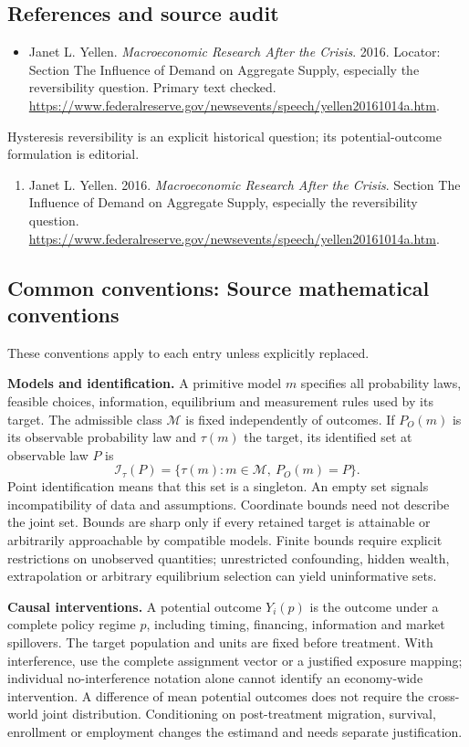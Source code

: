 \documentclass[11pt,a4paper]{article}
\begin{document}
\subsection*{References and source audit}
\begin{itemize}
\item Janet L. Yellen. \emph{Macroeconomic Research After the Crisis}. 2016. Locator: Section The Influence of Demand on Aggregate Supply, especially the reversibility question. Primary text checked. \url{https://www.federalreserve.gov/newsevents/speech/yellen20161014a.htm}.
\end{itemize}
Hysteresis reversibility is an explicit historical question; its potential-outcome formulation is editorial.
\begin{enumerate}\raggedright
\item\hypertarget{definitions:source:30007517:1}{} Janet L. Yellen. 2016. \emph{Macroeconomic Research After the Crisis}. Section The Influence of Demand on Aggregate Supply, especially the reversibility question.
\url{https://www.federalreserve.gov/newsevents/speech/yellen20161014a.htm}.
\end{enumerate}

\subsection*{Common conventions: Source mathematical conventions}

These conventions apply to each entry unless explicitly replaced.

\textbf{Models and identification.} A primitive model \(m\) specifies all probability laws, feasible choices, information, equilibrium and measurement rules used by its target. The admissible class \(\mathcal M\) is fixed independently of outcomes. If \(P_O(m)\) is its observable probability law and \(\tau(m)\) the target, its identified set at observable law \(P\) is
\[
 \mathcal I_\tau(P)=\{\tau(m):m\in\mathcal M,\ P_O(m)=P\}.
\]
Point identification means that this set is a singleton. An empty set signals incompatibility of data and assumptions. Coordinate bounds need not describe the joint set. Bounds are sharp only if every retained target is attainable or arbitrarily approachable by compatible models. Finite bounds require explicit restrictions on unobserved quantities; unrestricted confounding, hidden wealth, extrapolation or arbitrary equilibrium selection can yield uninformative sets.

\textbf{Causal interventions.} A potential outcome \(Y_i(p)\) is the outcome under a complete policy regime \(p\), including timing, financing, information and market spillovers. The target population and units are fixed before treatment. With interference, use the complete assignment vector or a justified exposure mapping; individual no-interference notation alone cannot identify an economy-wide intervention. A difference of mean potential outcomes does not require the cross-world joint distribution. Conditioning on post-treatment migration, survival, enrollment or employment changes the estimand and needs separate justification.
\end{document}
